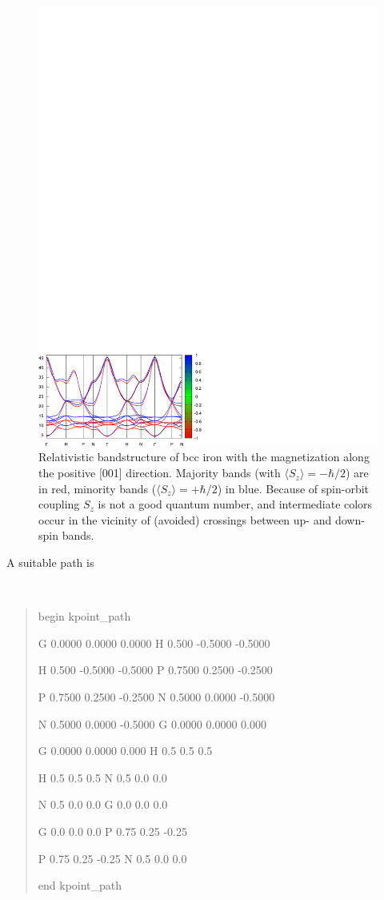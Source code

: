 \documentclass[a4paper,11pt,twoside]{article}
\begin{document}
\begin{figure}[h]
\begin{center}
\includegraphics[width=12cm]{Fe_bands}
\caption{Relativistic bandstructure of bcc iron with the magnetization
  along the positive [001] direction. Majority bands (with $\langle
  S_z\rangle=-\hbar/2$) are in red, minority bands ($\langle
  S_z\rangle =+\hbar/2$) in blue. Because of spin-orbit coupling $S_z$
  is not a good quantum number, and intermediate colors occur in the
  vicinity of (avoided) crossings between up- and down-spin bands.}
\label{fig:fe-bnd}
\end{center}
\end{figure}


A suitable path is
{\tt
\begin{quote}
begin kpoint\_path

G 0.0000 0.0000 0.0000   H 0.500 -0.5000 -0.5000

H 0.500 -0.5000 -0.5000  P 0.7500 0.2500 -0.2500

P 0.7500 0.2500 -0.2500  N 0.5000 0.0000 -0.5000

N 0.5000 0.0000 -0.5000  G 0.0000 0.0000 0.000

G 0.0000 0.0000 0.000    H 0.5 0.5 0.5

H 0.5 0.5 0.5            N 0.5 0.0 0.0

N 0.5 0.0 0.0            G 0.0 0.0 0.0

G 0.0 0.0 0.0            P 0.75 0.25 -0.25

P 0.75 0.25 -0.25        N 0.5 0.0 0.0

end kpoint\_path
\end{quote} }
\end{document}
